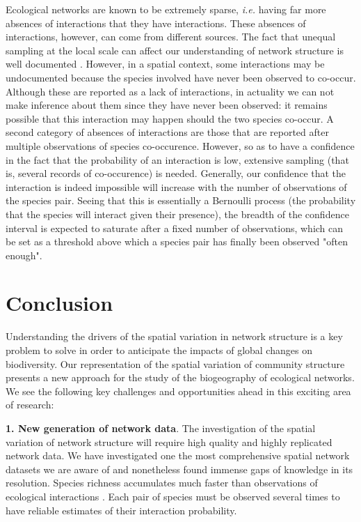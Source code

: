 \documentclass[12pt]{article}
\begin{document}
Ecological networks are known to be extremely sparse, \emph{i.e.} having far
more absences of interactions that they have interactions. These absences of
interactions, however, can come from different sources. The fact that unequal
sampling at the local scale can affect our understanding of network structure
is well documented \citep{Martinez1999}. However, in a spatial context, some
interactions may be undocumented because the species involved have never been
observed to co-occur. Although these are reported as a lack of interactions,
in actuality we can not make inference about them since they have never been
observed: it remains possible that this interaction may happen should the two
species co-occur. A second category of absences of interactions are those that
are reported after multiple observations of species co-occurence. However, so
as to have a confidence in the fact that the probability of an interaction is
low, extensive sampling (that is, several records of co-occurence) is needed. Generally,
our confidence that the interaction is indeed impossible will increase with
the number of observations of the species pair. Seeing that this is essentially
a Bernoulli process (the probability that the species will interact given
their presence), the breadth of the confidence interval is expected to
saturate after a fixed number of observations, which can be set as a threshold
above which a species pair has finally been observed "often enough".

\section*{Conclusion}

Understanding the drivers of the spatial variation in network structure is a
key problem to solve in order to anticipate the impacts of global changes on
biodiversity. Our representation of the spatial variation of community
structure presents a new approach for the study of the biogeography of ecological
networks. We see the following key challenges and opportunities ahead in this
exciting area of research:

\textbf{1. New generation of network data}. The investigation of the spatial
variation of network structure will require high quality and highly replicated
network data. We have investigated one the most comprehensive spatial network
datasets we are aware of and nonetheless found immense gaps of knowledge in its
resolution. Species richness accumulates much faster than observations of
ecological interactions \citep{Poisot2012}. Each pair of species must be
observed several times to have reliable estimates of their interaction
probability.
\end{document}
